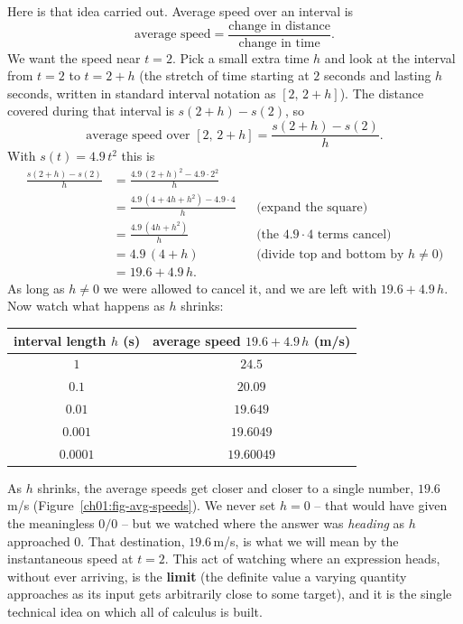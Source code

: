 Here is that idea carried out. Average speed over an interval is
\[
  \text{average speed} = \frac{\text{change in distance}}{\text{change in time}}.
\]
We want the speed near $t = 2$. Pick a small extra time $h$ and look at the
interval from $t = 2$ to $t = 2 + h$ (the stretch of time starting at $2$
seconds and lasting $h$ seconds, written in standard interval notation as
$[2,\,2+h]$). The distance covered during that interval is $s(2+h) - s(2)$, so
\[
  \text{average speed over } [2,\,2+h]
  = \frac{s(2+h) - s(2)}{h}.
\]
With $s(t) = 4.9\,t^2$ this is
\begin{align*}
  \frac{s(2+h) - s(2)}{h}
  &= \frac{4.9\,(2+h)^2 - 4.9\cdot 2^2}{h} \\
  &= \frac{4.9\,(4 + 4h + h^2) - 4.9\cdot 4}{h} && \text{(expand the square)} \\
  &= \frac{4.9\,(4h + h^2)}{h} && \text{(the $4.9\cdot 4$ terms cancel)} \\
  &= 4.9\,(4 + h) && \text{(divide top and bottom by $h \neq 0$)} \\
  &= 19.6 + 4.9\,h.
\end{align*}
As long as $h \neq 0$ we were allowed to
cancel it, and we are left with $19.6 + 4.9\,h$. Now watch what happens as $h$
shrinks:

\begin{center}
\begin{tabular}{cc}
\toprule
interval length $h$ (s) & average speed $19.6 + 4.9\,h$ (m/s) \\
\midrule
$1$       & $24.5$ \\
$0.1$     & $20.09$ \\
$0.01$    & $19.649$ \\
$0.001$   & $19.6049$ \\
$0.0001$  & $19.60049$ \\
\bottomrule
\end{tabular}
\end{center}

As $h$ shrinks, the average speeds get closer and closer to a single number,
$19.6$\,m/s (Figure~\ref{ch01:fig-avg-speeds}). We never set $h = 0$ -- that would
have given the meaningless $0/0$ -- but we watched where the answer was
\emph{heading} as $h$ approached $0$. That destination, $19.6$\,m/s, is what we
will mean by the instantaneous speed at $t = 2$. This act of watching where an
expression heads, without ever arriving, is the \textbf{limit} (the definite value
a varying quantity approaches as its input gets arbitrarily close to some target),
and it is the single technical idea on which all of calculus is built.

